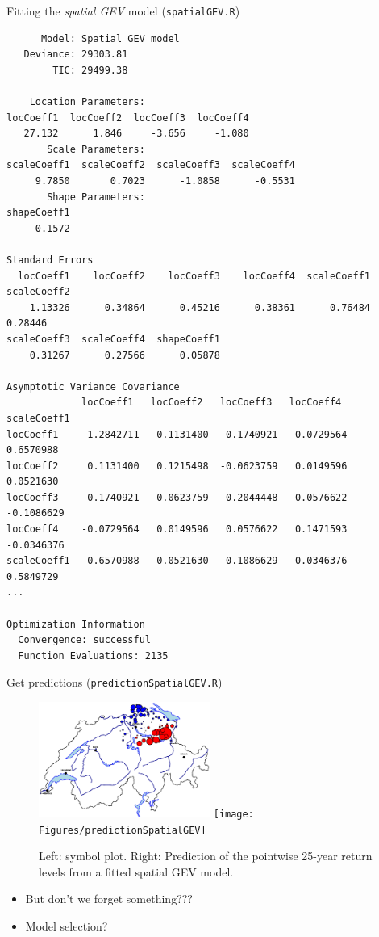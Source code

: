 \documentclass[mode=present,style=simple,paper=screen]{powerdot}
\theoremstyle{plain}%
\theoremstyle{definition}
\theoremstyle{remark}
\begin{document}
\begin{slide}[toc=,method=direct]{Fitting the \emph{spatial GEV} model
    (\texttt{spatialGEV.R}) \citep{Davison2012}}
  \vspace*{-1em}
  \tiny{
\begin{verbatim}
      Model: Spatial GEV model
   Deviance: 29303.81
        TIC: 29499.38

    Location Parameters:
locCoeff1  locCoeff2  locCoeff3  locCoeff4
   27.132      1.846     -3.656     -1.080
       Scale Parameters:
scaleCoeff1  scaleCoeff2  scaleCoeff3  scaleCoeff4
     9.7850       0.7023      -1.0858      -0.5531
       Shape Parameters:
shapeCoeff1
     0.1572

Standard Errors
  locCoeff1    locCoeff2    locCoeff3    locCoeff4  scaleCoeff1  scaleCoeff2
    1.13326      0.34864      0.45216      0.38361      0.76484      0.28446
scaleCoeff3  scaleCoeff4  shapeCoeff1
    0.31267      0.27566      0.05878

Asymptotic Variance Covariance
             locCoeff1   locCoeff2   locCoeff3   locCoeff4   scaleCoeff1
locCoeff1     1.2842711   0.1131400  -0.1740921  -0.0729564   0.6570988
locCoeff2     0.1131400   0.1215498  -0.0623759   0.0149596   0.0521630
locCoeff3    -0.1740921  -0.0623759   0.2044448   0.0576622  -0.1086629
locCoeff4    -0.0729564   0.0149596   0.0576622   0.1471593  -0.0346376
scaleCoeff1   0.6570988   0.0521630  -0.1086629  -0.0346376   0.5849729
...

Optimization Information
  Convergence: successful
  Function Evaluations: 2135
\end{verbatim}
    }
\end{slide}

\begin{wideslide}[toc=Prediction \#1]{Get predictions (\texttt{predictionSpatialGEV.R})}
  \begin{figure}
    \centering
    \includegraphics[width=0.5\textwidth]{Figures/symbolPlot}%
    \texttt{[image: Figures/predictionSpatialGEV]}
    \caption{Left: symbol plot. Right: Prediction of the pointwise
      25-year return levels from a fitted spatial GEV model.}
    \label{fig:prediction}
  \end{figure}
  \pause
  \begin{itemize}
  \item But don't we forget something??? \pause
  \item Model selection?
  \end{itemize}
\end{wideslide}
\end{document}
